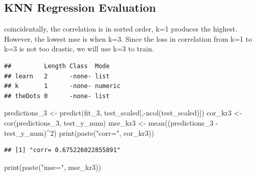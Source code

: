 \documentclass[
]{article}
\newenvironment{Shaded}{\begin{snugshade}}{\end{snugshade}}
\newcommand{\AttributeTok}[1]{\textcolor[rgb]{0.77,0.63,0.00}{#1}}
\newcommand{\DecValTok}[1]{\textcolor[rgb]{0.00,0.00,0.81}{#1}}
\newcommand{\FunctionTok}[1]{\textcolor[rgb]{0.00,0.00,0.00}{#1}}
\newcommand{\NormalTok}[1]{#1}
\newcommand{\OtherTok}[1]{\textcolor[rgb]{0.56,0.35,0.01}{#1}}
\newcommand{\SpecialCharTok}[1]{\textcolor[rgb]{0.00,0.00,0.00}{#1}}
\newcommand{\StringTok}[1]{\textcolor[rgb]{0.31,0.60,0.02}{#1}}
\begin{document}
\hypertarget{knn-regression-evaluation}{%
\subsection{KNN Regression Evaluation}\label{knn-regression-evaluation}}

coincidentally, the correlation is in sorted order, k=1 produces the
highest. However, the lowest mse is when k=3. Since the loss in
correlation from k=1 to k=3 is not too drastic, we will use k=3 to
train.

\begin{Shaded}
\end{Shaded}

\begin{verbatim}
##         Length Class  Mode   
## learn   2      -none- list   
## k       1      -none- numeric
## theDots 0      -none- list
\end{verbatim}

\begin{Shaded}
\begin{Highlighting}[]
\NormalTok{predictions\_3 }\OtherTok{\textless{}{-}} \FunctionTok{predict}\NormalTok{(fit\_3, test\_scaled[,}\SpecialCharTok{{-}}\FunctionTok{ncol}\NormalTok{(test\_scaled)])}
\NormalTok{cor\_kr3 }\OtherTok{\textless{}{-}} \FunctionTok{cor}\NormalTok{(predictions\_3, test\_y\_num)}
\NormalTok{mse\_kr3 }\OtherTok{\textless{}{-}} \FunctionTok{mean}\NormalTok{((predictions\_3 }\SpecialCharTok{{-}}\NormalTok{ test\_y\_num)}\SpecialCharTok{\^{}}\DecValTok{2}\NormalTok{)}
\FunctionTok{print}\NormalTok{(}\FunctionTok{paste}\NormalTok{(}\StringTok{"corr="}\NormalTok{, cor\_kr3))}
\end{Highlighting}
\end{Shaded}

\begin{verbatim}
## [1] "corr= 0.675226022855891"
\end{verbatim}

\begin{Shaded}
\begin{Highlighting}[]
\FunctionTok{print}\NormalTok{(}\FunctionTok{paste}\NormalTok{(}\StringTok{"mse="}\NormalTok{, mse\_kr3))}
\end{Highlighting}
\end{Shaded}
\end{document}

